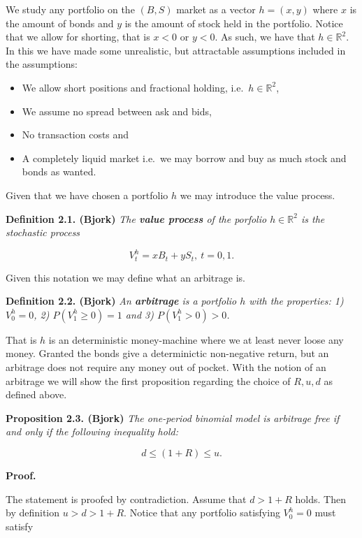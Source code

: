 \documentclass[
]{book}
\providecommand{\tightlist}{%
  \setlength{\itemsep}{0pt}\setlength{\parskip}{0pt}}
\begin{document}
We study any portfolio on the \((B,S)\) market as a vector \(h=(x,y)\) where \(x\) is the amount of bonds and \(y\) is the amount of stock held in the portfolio. Notice that we allow for shorting, that is \(x<0\) or \(y<0\). As such, we have that \(h\in \mathbb{R}^2\). In this we have made some unrealistic, but attractable assumptions included in the assumptions:

\begin{itemize}
\tightlist
\item
  We allow short positions and fractional holding, i.e.~\(h\in \mathbb{R}^2\),
\item
  We assume no spread between ask and bids,
\item
  No transaction costs and
\item
  A completely liquid market i.e.~we may borrow and buy as much stock and bonds as wanted.
\end{itemize}

Given that we have chosen a portfolio \(h\) we may introduce the value process.

\textbf{Definition 2.1. (Bjork)} \emph{The \textbf{value process} of the porfolio \(h\in\mathbb{R}^2\) is the stochastic process}

\[V^h_t=xB_t+yS_t,\ t=0,1.\]

Given this notation we may define what an arbitrage is.

\textbf{Definition 2.2. (Bjork)} \emph{An \textbf{arbitrage} is a portfolio \(h\) with the properties: 1) \(V^h_0=0\), 2) \(P(V^h_1\ge 0)=1\) and 3) \(P(V^h_1>0)>0\).}

That is \(h\) is an deterministic money-machine where we at least never loose any money. Granted the bonds give a determinictic non-negative return, but an arbitrage does not require any money out of pocket. With the notion of an arbitrage we will show the first proposition regarding the choice of \(R,u,d\) as defined above.

\textbf{Proposition 2.3. (Bjork)} \emph{The one-period binomial model is arbitrage free if and only if the following inequality hold:}

\[d\le (1+R)\le u.\tag{2.1}\]

\noindent\makebox[\linewidth]{\rule{\textwidth}{0.4pt}}

\textbf{Proof.}

The statement is proofed by contradiction. Assume that \(d>1+R\) holds. Then by definition \(u>d>1+R\). Notice that any portfolio satisfying \(V_0^h=0\) must satisfy
\end{document}
